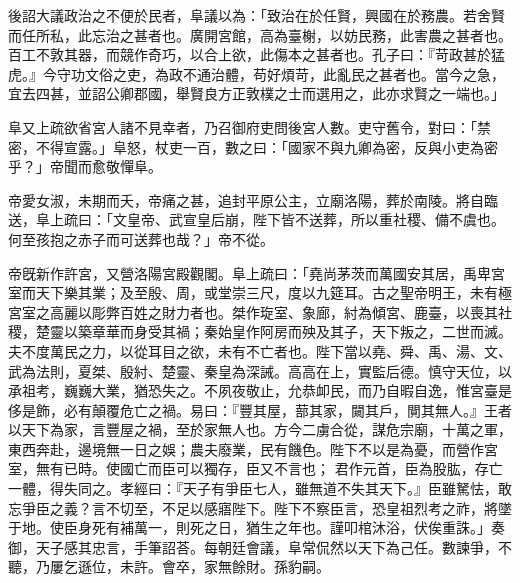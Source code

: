 \begin{pinyinscope}
 
 
 
 後詔大議政治之不便於民者，阜議以為：「致治在於任賢，興國在於務農。若舍賢而任所私，此忘治之甚者也。廣開宮館，高為臺榭，以妨民務，此害農之甚者也。百工不敦其器，而競作奇巧，以合上欲，此傷本之甚者也。孔子曰：『苛政甚於猛虎。』今守功文俗之吏，為政不通治體，苟好煩苛，此亂民之甚者也。當今之急，宜去四甚，並詔公卿郡國，舉賢良方正敦樸之士而選用之，此亦求賢之一端也。」
 
 
 
 
 阜又上疏欲省宮人諸不見幸者，乃召御府吏問後宮人數。吏守舊令，對曰：「禁密，不得宣露。」阜怒，杖吏一百，數之曰：「國家不與九卿為密，反與小吏為密乎？」帝聞而愈敬憚阜。
 
 
 
 
 帝愛女淑，未期而夭，帝痛之甚，追封平原公主，立廟洛陽，葬於南陵。將自臨送，阜上疏曰：「文皇帝、武宣皇后崩，陛下皆不送葬，所以重社稷、備不虞也。何至孩抱之赤子而可送葬也哉？」帝不從。
 
 
帝旣新作許宮，又營洛陽宮殿觀閣。阜上疏曰：「堯尚茅茨而萬國安其居，禹卑宮室而天下樂其業；及至殷、周，或堂崇三尺，度以九筵耳。古之聖帝明王，未有極宮室之高麗以彫弊百姓之財力者也。桀作琁室、象廊，紂為傾宮、鹿臺，以喪其社稷，楚靈以築章華而身受其禍；秦始皇作阿房而殃及其子，天下叛之，二世而滅。夫不度萬民之力，以從耳目之欲，未有不亡者也。陛下當以堯、舜、禹、湯、文、武為法則，夏桀、殷紂、楚靈、秦皇為深誡。高高在上，實監后德。慎守天位，以承祖考，巍巍大業，猶恐失之。不夙夜敬止，允恭卹民，而乃自暇自逸，惟宮臺是侈是飾，必有顛覆危亡之禍。易曰：『豐其屋，蔀其家，闚其戶，閴其無人。』王者以天下為家，言豐屋之禍，至於家無人也。方今二虜合從，謀危宗廟，十萬之軍，東西奔赴，邊境無一日之娛；農夫廢業，民有饑色。陛下不以是為憂，而營作宮室，無有已時。使國亡而臣可以獨存，臣又不言也；
 君作元首，臣為股肱，存亡一體，得失同之。孝經曰：『天子有爭臣七人，雖無道不失其天下。』臣雖駑怯，敢忘爭臣之義？言不切至，不足以感寤陛下。陛下不察臣言，恐皇祖烈考之祚，將墜于地。使臣身死有補萬一，則死之日，猶生之年也。謹叩棺沐浴，伏俟重誅。」奏御，天子感其忠言，手筆詔荅。每朝廷會議，阜常侃然以天下為己任。數諫爭，不聽，乃屢乞遜位，未許。會卒，家無餘財。孫豹嗣。
 
 
\end{pinyinscope}